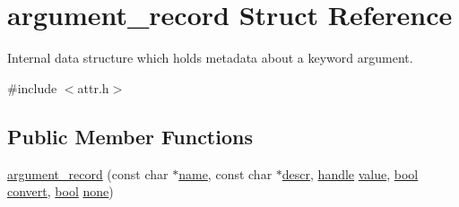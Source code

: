 \hypertarget{structargument__record}{}\section{argument\+\_\+record Struct Reference}
\label{structargument__record}


Internal data structure which holds metadata about a keyword argument.  




{\ttfamily \#include $<$attr.\+h$>$}

\subsection*{Public Member Functions}
\begin{DoxyCompactItemize}
\item 
\mbox{\hyperlink{structargument__record_a3bb6ccaa62ea9acee95695698f949f97}{argument\+\_\+record}} (const char $\ast$\mbox{\hyperlink{structname}{name}}, const char $\ast$\mbox{\hyperlink{structdescr}{descr}}, \mbox{\hyperlink{classhandle}{handle}} \mbox{\hyperlink{_s_d_l__opengl__glext_8h_a8ad81492d410ff2ac11f754f4042150f}{value}}, \mbox{\hyperlink{asdl_8h_af6a258d8f3ee5206d682d799316314b1}{bool}} \mbox{\hyperlink{structargument__record_ab885e9c26fb95309b6f3f03410f36d30}{convert}}, \mbox{\hyperlink{asdl_8h_af6a258d8f3ee5206d682d799316314b1}{bool}} \mbox{\hyperlink{classnone}{none}})
\end{DoxyCompactItemize}
